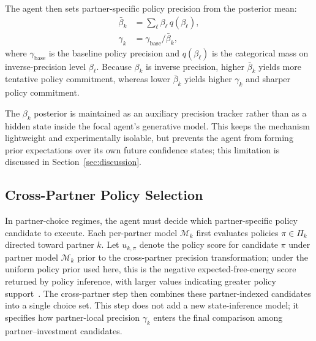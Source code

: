 \documentclass[runningheads,orivec]{llncs}
\begin{document}
The agent then sets partner-specific policy precision from the posterior mean:
\begin{equation}
\begin{aligned}
\bar{\beta}_k &= \sum_{\ell} \beta_\ell \, q(\beta_\ell), \\
\gamma_k &= \gamma_{\text{base}} / \bar{\beta}_k,
\end{aligned}
\label{eq:gamma_update}
\end{equation}
where $\gamma_{\text{base}}$ is the baseline policy precision and $q(\beta_\ell)$ is the categorical mass on inverse-precision level $\beta_\ell$. Because $\beta_k$ is inverse precision, higher $\bar{\beta}_k$ yields more tentative policy commitment, whereas lower $\bar{\beta}_k$ yields higher $\gamma_k$ and sharper policy commitment.

The $\beta_k$ posterior is maintained as an auxiliary precision tracker rather than as a hidden state inside the focal agent's generative model. This keeps the mechanism lightweight and experimentally isolable, but prevents the agent from forming prior expectations over its own future confidence states; this limitation is discussed in Section~\ref{sec:discussion}.

\subsection{Cross-Partner Policy Selection}
\label{sec:cross_partner_policy}

In partner-choice regimes, the agent must decide which partner-specific policy candidate to execute. Each per-partner model \(\mathcal{M}_k\) first evaluates policies \(\pi \in \Pi_k\) directed toward partner \(k\). Let \(u_{k,\pi}\) denote the policy score for candidate \(\pi\) under partner model \(\mathcal{M}_k\) prior to the cross-partner precision transformation; under the uniform policy prior used here, this is the negative expected-free-energy score returned by policy inference, with larger values indicating greater policy support~\cite{Friston2017ProcessTheory,Heins2022Pymdp}. The cross-partner step then combines these partner-indexed candidates into a single choice set. This step does not add a new state-inference model; it specifies how partner-local precision \(\gamma_k\) enters the final comparison among partner--investment candidates.
\end{document}
